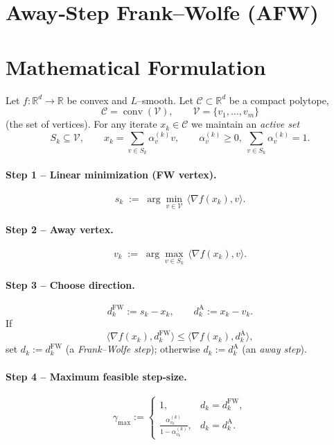 \documentclass{article}
\newcommand{\R}{\mathbb{R}}
\newcommand{\C}{\mathcal{C}}
\newcommand{\V}{\mathcal{V}}
\begin{document}
\section*{Away‑Step Frank–Wolfe (AFW)}

\section*{Mathematical Formulation}
Let $f:\R^d\rightarrow\R$ be convex and $L$–smooth.  
Let $\C\subset\R^d$ be a compact polytope,
\[
\C=\operatorname{conv}(\V),\qquad \V=\{v_1,\dots ,v_m\}
\]
(the set of vertices).  
For any iterate $x_k\in\C$ we maintain an \emph{active set}
\[
S_k\subseteq \V,\qquad
x_k=\sum_{v\in S_k}\alpha_v^{(k)}v,\qquad
\alpha_v^{(k)}\ge 0,\ \sum_{v\in S_k}\alpha_v^{(k)}=1 .
\]

\paragraph{Step 1 – Linear minimization (FW vertex).}
\[
s_k \;:=\; \arg\min_{v\in\V}\,\langle\nabla f(x_k),v\rangle .
\tag{1}
\]

\paragraph{Step 2 – Away vertex.}
\[
v_k \;:=\; \arg\max_{v\in S_k}\,\langle\nabla f(x_k),v\rangle .
\tag{2}
\]

\paragraph{Step 3 – Choose direction.}
\[
d_k^{\text{FW}} := s_k-x_k,\qquad
d_k^{\text{A}}  := x_k-v_k .
\]
If 
\[
\langle\nabla f(x_k),d_k^{\text{FW}}\rangle\le
\langle\nabla f(x_k),d_k^{\text{A}}\rangle,
\]
set $d_k:=d_k^{\text{FW}}$ (a \emph{Frank–Wolfe step}); otherwise $d_k:=d_k^{\text{A}}$ (an \emph{away step}).

\paragraph{Step 4 – Maximum feasible step‑size.}
\[
\gamma_{\max}:=
\begin{cases}
1, & d_k=d_k^{\text{FW}},\\[4pt]
\displaystyle\frac{\alpha_{v_k}^{(k)}}{1-\alpha_{v_k}^{(k)}},
& d_k=d_k^{\text{A}} .
\end{cases}
\tag{3}
\]
\end{document}
